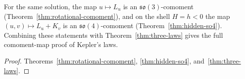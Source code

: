 \begin{corollary}\label{thm:source-package}
For the same solution, the map $u \mapsto L_u$ is an $\mathfrak{so}(3)$-comoment (Theorem~\ref{thm:rotational-comoment}), and on the shell $H = h < 0$ the map $(u, v) \mapsto L_u + K_v$ is an $\mathfrak{so}(4)$-comoment (Theorem~\ref{thm:hidden-so4}).
Combining these statements with Theorem~\ref{thm:three-laws} gives the full comoment-map proof of Kepler's laws.
\leanok
\begin{proof}
Theorems~\ref{thm:rotational-comoment}, \ref{thm:hidden-so4}, and~\ref{thm:three-laws}.
\end{proof}
\end{corollary}
